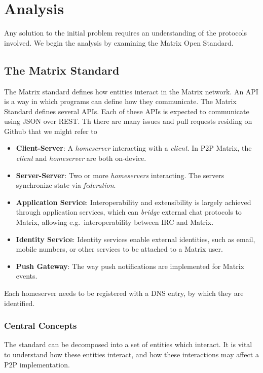 \chapter{Analysis}
Any solution to the initial problem requires an understanding of the protocols involved.
We begin the analysis by examining the Matrix Open Standard.

\section{The Matrix Standard}
The Matrix standard defines how entities interact in the Matrix network.
An \ac{API} is a way in which programs can define how they communicate.
The Matrix Standard defines several \ac{API}s.
Each of these \ac{API}s is expected to communicate using \ac{JSON} over \ac{REST}.
Th there are many issues and pull requests residing on Github that we might refer to
\begin{itemize}
      \item \textbf{Client-Server}:
            A \textit{homeserver} interacting with a \textit{client}.
            In \ac{P2P} Matrix, the \textit{client} and \textit{homeserver} are both on-device.
      \item \textbf{Server-Server}:
            Two or more \textit{homeservers} interacting.
            The servers synchronize state via \textit{federation}.
      \item \textbf{Application Service}:
            Interoperability and extensibility is largely achieved through application services, which can \textit{bridge} external chat protocols to Matrix, allowing e.g.~interoperability between \ac{IRC} and Matrix.
      \item \textbf{Identity Service}:
            Identity services enable external identities, such as email, mobile numbers, or other services to be attached to a Matrix user.
      \item \textbf{Push Gateway}:
            The way push notifications are implemented for Matrix events.
\end{itemize}

Each homeserver needs to be registered with a \ac{DNS} entry, by which they are identified.

\subsection{Central Concepts}
The standard can be decomposed into a set of entities which interact.
It is vital to understand how these entities interact, and how these interactions may affect a \ac{P2P} implementation.

